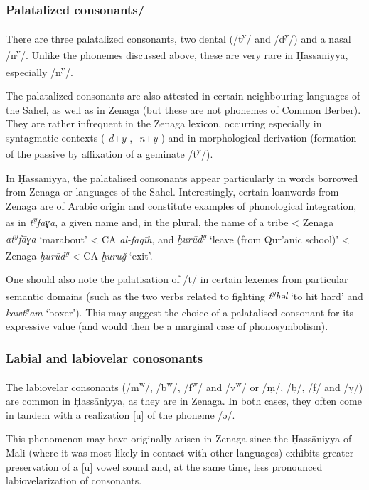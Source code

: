 \documentclass[output=paper]{langsci/langscibook}
\begin{document}
\subsubsection{ Palatalized consonants/} %
There are three palatalized consonants, two dental (/t\textsuperscript{y}/\textsuperscript{} and /d\textsuperscript{y}/) and a nasal /n\textsuperscript{y}/. Unlike the phonemes discussed above, these are very rare in Ḥassāniyya, especially /n\textsuperscript{y}/.

The palatalized consonants are also attested in certain neighbouring languages of the Sahel, as well as in Zenaga (but these are not phonemes of Common Berber). They are rather infrequent in the Zenaga lexicon, occurring especially in syntagmatic contexts (\textit{{}-d}+\textit{y-}, \textit{{}-n}+\textit{y-}) and in morphological derivation (formation of the passive by affixation of a geminate /t\textsuperscript{y}/).

In Ḥassāniyya, the palatalised consonants appear particularly in words borrowed from Zenaga or languages of the Sahel. Interestingly, certain loanwords from Zenaga are of Arabic origin and constitute examples of phonological integration, as in \textit{t\textsuperscript{y}}\textit{fāɣa}, a given name and, in the plural, the name of a tribe < Zenaga \textit{at\textsuperscript{y}}\textit{fāɣa} ‘marabout’ < CA \textit{al-faqīh}, and \textit{ḫurūd\textsuperscript{y}} ‘leave (from Qur’anic school)’ < Zenaga \textit{ḫurūd\textsuperscript{y} }< CA \textit{ḫuruǧ} ‘exit’.

One should also note the palatisation of /t/ in certain lexemes from particular semantic domains (such as the two verbs related to fighting \textit{t\textsuperscript{y}}\textit{bəl} ‘to hit hard’ and \textit{kawt\textsuperscript{y}}\textit{am} ‘boxer’). This may suggest the choice of a palatalised consonant for its expressive value (and would then be a marginal case of phonosymbolism).

\subsubsection{ Labial and labiovelar conosonants} %
The labiovelar consonants (/m\textsuperscript{w}/, /b\textsuperscript{w}/, /f\textsuperscript{w}/ and /v\textsuperscript{w}/ or /ṃ/, /ḅ/, /f̣/ and /ṿ/) are common in Ḥassāniyya, as they are in Zenaga. In both cases, they often come in tandem with a realization [u] of the phoneme /ə/. 

This phenomenon may have originally arisen in Zenaga since the Ḥassāniyya of Mali (where it was most likely in contact with other languages) exhibits greater preservation of a [u] vowel sound and, at the same time, less pronounced labiovelarization of consonants. 
\end{document}
